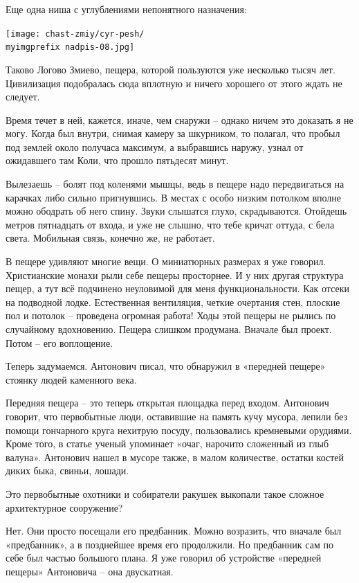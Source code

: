 \newpage

Еще одна ниша с углублениями непонятного назначения:

\begin{center}
\texttt{[image: chast-zmiy/cyr-pesh/\\myimgprefix nadpis-08.jpg]}
\end{center}

Таково Логово Змиево, пещера, которой пользуются уже несколько тысяч лет. Цивилизация подобралась сюда вплотную и ничего хорошего от этого ждать не следует.

Время течет в ней, кажется, иначе, чем снаружи – однако ничем это доказать я не могу. Когда был внутри, снимая камеру за шкурником, то полагал, что пробыл под землей около получаса максимум, а выбравшись наружу, узнал от ожидавшего там Коли, что прошло пятьдесят минут.

Вылезаешь – болят под коленями мышцы, ведь в пещере надо передвигаться на карачках либо сильно пригнувшись. В местах с особо низким потолком вполне можно ободрать об него спину. Звуки слышатся глухо, скрадываются. Отойдешь метров пятнадцать от входа, и уже не слышно, что тебе кричат оттуда, с бела света. Мобильная связь, конечно же, не работает.

В пещере удивляют многие вещи. О миниатюрных размерах я уже говорил. Христианские монахи рыли себе пещеры просторнее. И у них другая структура пещер, а тут всё подчинено неуловимой для меня функциональности. Как отсеки на подводной лодке. Естественная вентиляция, четкие очертания стен, плоские пол и потолок – проведена огромная работа! Ходы этой пещеры не рылись по случайному вдохновению. Пещера слишком продумана. Вначале был проект. Потом – его воплощение.

Теперь задумаемся. Антонович писал, что обнаружил в «передней пещере» стоянку людей каменного века. 

Передняя пещера – это теперь открытая площадка перед входом. Антонович говорит, что первобытные люди, оставившие на память кучу мусора, лепили без помощи гончарного круга нехитрую посуду, пользовались кремневыми орудиями. Кроме того, в статье ученый упоминает «очаг, нарочито сложенный из глыб валуна». Антонович нашел в мусоре также, в малом количестве, остатки костей диких быка, свиньи, лошади.

Это первобытные охотники и собиратели ракушек выкопали такое сложное архитектурное сооружение? 

Нет. Они просто посещали его предбанник. Можно возразить, что вначале был «предбанник», а в позднейшее время его продолжили. Но предбанник сам по себе был частью большого плана. Я уже говорил об устройстве «передней пещеры» Антоновича – она двускатная.

